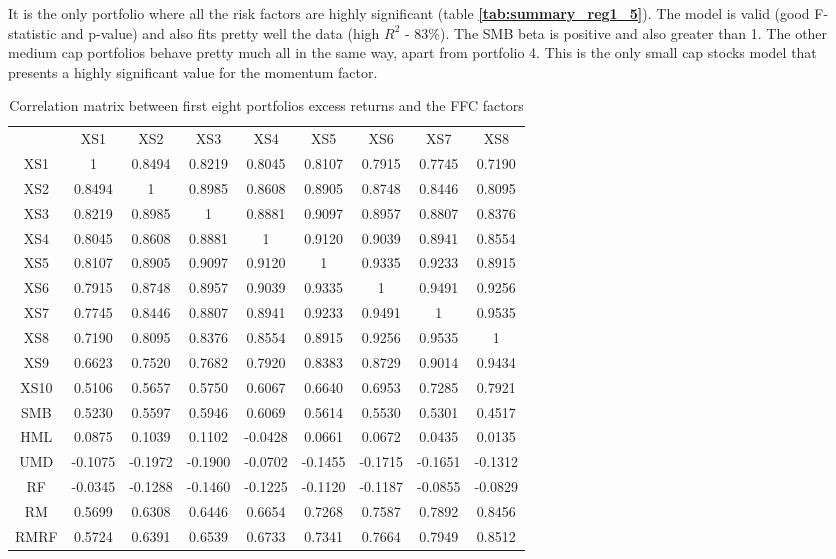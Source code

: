 \documentclass[11pt]{article}
\begin{document}
It is the only portfolio where all the risk factors are highly significant (table \textbf{\ref{tab:summary_reg1_5}}). 
The model is valid (good F-statistic and p-value) and also fits pretty well the data (high $R^2$ - 83\%). The SMB beta is positive and also greater than 1. 
The other medium cap portfolios behave pretty much all in the same way, apart from portfolio 4. This is the only small cap stocks model that presents a highly significant value 
for the momentum factor.
\clearpage
\begin{table}[H]
    \centering
    \small
    \begin{tabular}{ccccccccc}
    \toprule
    \toprule
        & XS1 & XS2 & XS3 & XS4 & XS5 & XS6 & XS7 & XS8 \\
        XS1 & 1 & 0.8494 & 0.8219 & 0.8045 & 0.8107 & 0.7915 & 0.7745 & 0.7190 \\
        XS2 & 0.8494 & 1 & 0.8985 & 0.8608 & 0.8905 & 0.8748 & 0.8446 & 0.8095 \\
        XS3 & 0.8219 & 0.8985 & 1 & 0.8881 & 0.9097 & 0.8957 & 0.8807 & 0.8376 \\
        XS4 & 0.8045 & 0.8608 & 0.8881 & 1 & 0.9120 & 0.9039 & 0.8941 & 0.8554 \\
        XS5 & 0.8107 & 0.8905 & 0.9097 & 0.9120 & 1 & 0.9335 & 0.9233 & 0.8915 \\
        XS6 & 0.7915 & 0.8748 & 0.8957 & 0.9039 & 0.9335 & 1 & 0.9491 & 0.9256 \\
        XS7 & 0.7745 & 0.8446 & 0.8807 & 0.8941 & 0.9233 & 0.9491 & 1 & 0.9535 \\
        XS8 & 0.7190 & 0.8095 & 0.8376 & 0.8554 & 0.8915 & 0.9256 & 0.9535 & 1 \\
        XS9 & 0.6623 & 0.7520 & 0.7682 & 0.7920 & 0.8383 & 0.8729 & 0.9014 & 0.9434 \\
        XS10 & 0.5106 & 0.5657 & 0.5750 & 0.6067 & 0.6640 & 0.6953 & 0.7285 & 0.7921 \\
        SMB & 0.5230 & 0.5597 & 0.5946 & 0.6069 & 0.5614 & 0.5530 & 0.5301 & 0.4517 \\
        HML & 0.0875 & 0.1039 & 0.1102 & -0.0428 & 0.0661 & 0.0672 & 0.0435 & 0.0135 \\
        UMD & -0.1075 & -0.1972 & -0.1900 & -0.0702 & -0.1455 & -0.1715 & -0.1651 & -0.1312 \\
        RF & -0.0345 & -0.1288 & -0.1460 & -0.1225 & -0.1120 & -0.1187 & -0.0855 & -0.0829 \\
        RM & 0.5699 & 0.6308 & 0.6446 & 0.6654 & 0.7268 & 0.7587 & 0.7892 & 0.8456 \\
        RMRF & 0.5724 & 0.6391 & 0.6539 & 0.6733 & 0.7341 & 0.7664 & 0.7949 & 0.8512 \\
        \bottomrule
        \bottomrule
    \end{tabular}
    \caption{Correlation matrix between first eight portfolios excess returns and the FFC factors}
    \label{tab:corr_matrix_tot8}
\end{table}
\end{document}
